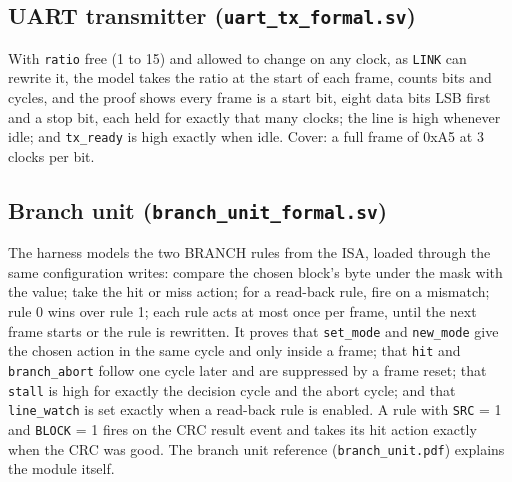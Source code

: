 \documentclass[11pt,a4paper]{article}
\newcommand{\file}[1]{\texttt{#1}}
\begin{document}
\subsection{UART transmitter (\file{uart\_tx\_formal.sv})}
With \texttt{ratio} free (1 to 15) and allowed to change on any clock, as \texttt{LINK} can rewrite it, the model takes the ratio at the start of each frame, counts bits and cycles, and the proof shows every frame is a start bit, eight data bits LSB first and a stop bit, each held for exactly that many clocks; the line is high whenever idle; and \texttt{tx\_ready} is high exactly when idle. Cover: a full frame of 0xA5 at 3 clocks per bit.

\subsection{Branch unit (\file{branch\_unit\_formal.sv})}
The harness models the two BRANCH rules from the ISA, loaded through the same configuration writes: compare the chosen block's byte under the mask with the value; take the hit or miss action; for a read-back rule, fire on a mismatch; rule 0 wins over rule 1; each rule acts at most once per frame, until the next frame starts or the rule is rewritten. It proves that \texttt{set\_mode} and \texttt{new\_mode} give the chosen action in the same cycle and only inside a frame; that \texttt{hit} and \texttt{branch\_abort} follow one cycle later and are suppressed by a frame reset; that \texttt{stall} is high for exactly the decision cycle and the abort cycle; and that \texttt{line\_watch} is set exactly when a read-back rule is enabled. A rule with \texttt{SRC} = 1 and \texttt{BLOCK} = 1 fires on the CRC result event and takes its hit action exactly when the CRC was good. The branch unit reference (\file{branch\_unit.pdf}) explains the module itself.
\end{document}
